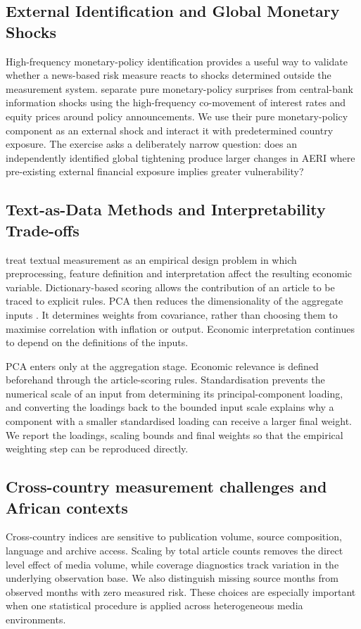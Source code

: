 \documentclass[12pt]{article}
\begin{document}
\subsection{External Identification and Global Monetary Shocks}\label{sec:literature_external_id}
High-frequency monetary-policy identification provides a useful way to validate whether a news-based risk measure reacts to shocks determined outside the measurement system. \citet{jarocinski2020} separate pure monetary-policy surprises from central-bank information shocks using the high-frequency co-movement of interest rates and equity prices around policy announcements. We use their pure monetary-policy component as an external shock and interact it with predetermined country exposure. The exercise asks a deliberately narrow question: does an independently identified global tightening produce larger changes in AERI where pre-existing external financial exposure implies greater vulnerability?

\subsection{Text-as-Data Methods and Interpretability Trade-offs}
\citet{gentzkow2019} treat textual measurement as an empirical design problem in which preprocessing, feature definition and interpretation affect the resulting economic variable. Dictionary-based scoring allows the contribution of an article to be traced to explicit rules. PCA then reduces the dimensionality of the aggregate inputs \citep{jolliffe2016}. It determines weights from covariance, rather than choosing them to maximise correlation with inflation or output. Economic interpretation continues to depend on the definitions of the inputs.

PCA enters only at the aggregation stage. Economic relevance is defined beforehand through the article-scoring rules. Standardisation prevents the numerical scale of an input from determining its principal-component loading, and converting the loadings back to the bounded input scale explains why a component with a smaller standardised loading can receive a larger final weight. We report the loadings, scaling bounds and final weights so that the empirical weighting step can be reproduced directly.
\subsection{Cross-country measurement challenges and African contexts}
Cross-country indices are sensitive to publication volume, source composition, language and archive access. Scaling by total article counts removes the direct level effect of media volume, while coverage diagnostics track variation in the underlying observation base. We also distinguish missing source months from observed months with zero measured risk. These choices are especially important when one statistical procedure is applied across heterogeneous media environments.
\end{document}
